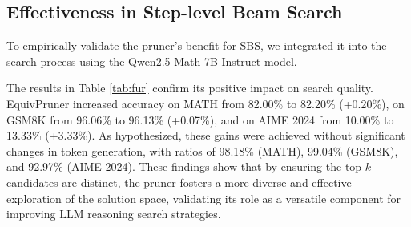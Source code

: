 \documentclass[11pt]{article}
\begin{document}
\subsection{Effectiveness in Step-level Beam Search}
\label{subsec:EquivPruner_SBS}
To empirically validate the pruner's benefit for SBS, we integrated it into the search process using the Qwen2.5-Math-7B-Instruct model.

The results in Table \ref{tab:fur} confirm its positive impact on search quality. EquivPruner increased accuracy on MATH from 82.00\% to 82.20\% (+0.20\%), on GSM8K from 96.06\% to 96.13\% (+0.07\%), and on AIME 2024 from 10.00\% to 13.33\% (+3.33\%). As hypothesized, these gains were achieved without significant changes in token generation, with ratios of 98.18\% (MATH), 99.04\% (GSM8K), and 92.97\% (AIME 2024).
These findings show that by ensuring the top-$k$ candidates are distinct, the pruner fosters a more diverse and effective exploration of the solution space, validating its role as a versatile component for improving LLM reasoning search strategies.

\end{document}
